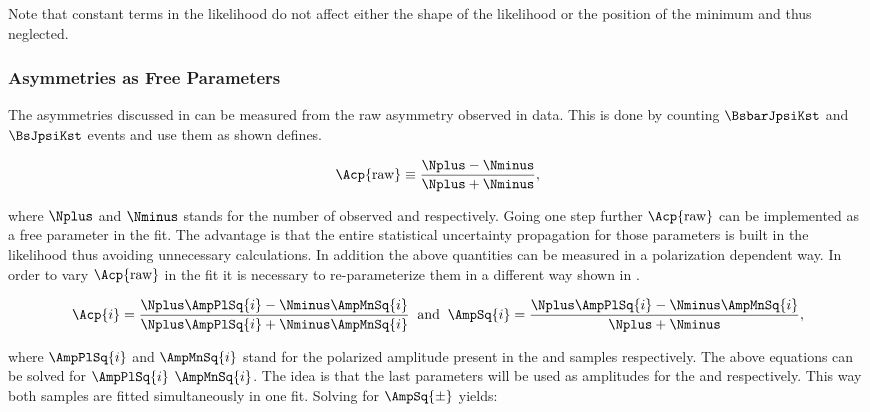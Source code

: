 \noindent Note that constant terms in the likelihood do not affect either the shape of the likelihood or the position of the minimum and thus neglected.




\subsubsection{\CP Asymmetries as Free Parameters}
\label{cp_assymetries_and_total_decay_rate}
The \CP asymmetries discussed in  can be measured from the raw asymmetry observed in data.
This is done by counting $\BsbarJpsiKst$ and $\BsJpsiKst$ events and use them as shown  defines.

\begin{equation}
\Acp{\text{raw}} \equiv \frac{\Nplus - \Nminus}{\Nplus + \Nminus},
\label{acp_mes}
\end{equation}

\noindent where $\Nplus$ and $\Nminus$ stands for the number of observed \BsbarJpsiKst and \BsJpsiKst respectively. 
Going one step further $\Acp{\text{raw}}$ can be implemented as a free parameter in the fit. The advantage
is that the entire statistical uncertainty propagation for those parameters is built in the likelihood thus avoiding
unnecessary calculations. In addition the above quantities can be measured in a polarization dependent way. In order
to vary $\Acp{\text{raw}}$ in the fit it is necessary to re-parameterize them in a different way shown in .

\begin{equation}
\Acp{i} = \frac{\Nplus\AmpPlSq{i} - \Nminus\AmpMnSq{i}}{\Nplus\AmpPlSq{i} + \Nminus\AmpMnSq{i} }\;\; \text{and} \;\;
\AmpSq{i} = \frac{ \Nplus \AmpPlSq{i} - \Nminus\AmpMnSq{i}}{\Nplus + \Nminus},
\label{acp_param}
\end{equation}

\noindent where $\AmpPlSq{i}$ and $\AmpMnSq{i}$ stand for the polarized amplitude present in the \BsbarJpsiKst
and \BsJpsiKst samples respectively. The above equations can be solved for $\AmpPlSq{i}$  $\AmpMnSq{i}$. The idea
is that the last parameters will be used as amplitudes for the \BsbarJpsiKst and \BsJpsiKst \pdfs respectively.
This way both samples are fitted simultaneously in one fit. Solving  for $\AmpSq{\pm}$ yields: 

